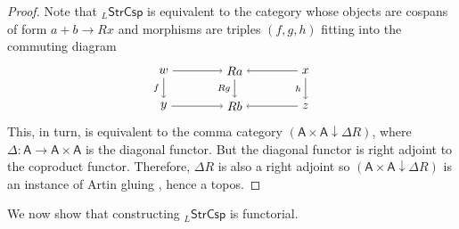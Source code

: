 \documentclass{amsart}
\newcommand{\A}{\cat{A}}
\newcommand{\StrCsp}{\cat{StrCsp}}
\newcommand{\cat}[1]{\mathsf{#1}}
\newcommand{\from}{\colon}
\newcommand{\csp}[3]{#1 + #3 \to #2}
\theoremstyle{remark}
\theoremstyle{definition}
\begin{document}
\begin{proof}
  Note that $ _{L}\StrCsp $ is equivalent to the category
  whose objects are cospans of form
  \(
    \csp{a}{Rx}{b}
  \)
  and morphisms are triples $ ( f,g,h ) $ fitting into the
  commuting diagram
  \[
    \begin{tikzpicture}
      \node (1) at (-2,1) {\( w \)};
      \node (2) at (0,1) {\( Ra \)};
      \node (3) at (2,1) {\( x \)};
      \node (4) at (-2,0) {\( y \)};
      \node (5) at (0,0) {\( Rb \)};
      \node (6) at (2,0) {\( z \)};
      \draw [->] (1) to  node [] {\scriptsize{\(  \)}} (2);
      \draw [->] (3) to node [] {\scriptsize{\(  \)}} (2);
      \draw [->] (4) to node [] {\scriptsize{\(  \)}} (5);
      \draw [->] (6) to node [] {\scriptsize{\(  \)}} (5);
      \draw [->] (1) to node [left] {\scriptsize{\( f \)}} (4);
      \draw [->] (2) to node [left] {\scriptsize{\( Rg \)}} (5);
      \draw [->] (3) to node [left] {\scriptsize{\( h \)}} (6); 
    \end{tikzpicture}
  \]
  This, in turn, is equivalent to the comma category
  $ ( \A \times \A \downarrow \Delta R ) $, where
  $ \Delta \from \A \to \A \times \A $ is the diagonal
  functor. But the diagonal functor is right adjoint to the
  coproduct functor. Therefore, $ \Delta R $ is also a right
  adjoint so $ ( \A \times \A \downarrow \Delta R ) $ is an
  instance of Artin gluing \cite{Wraith_ArtinGlue}, hence a
  topos.
\end{proof}

We now show that constructing $ _{L}\StrCsp $ is functorial.
\end{document}
